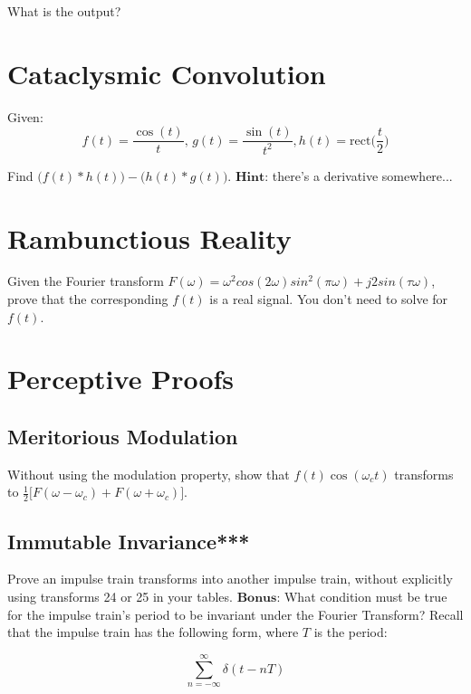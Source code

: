 \documentclass{article}
\begin{document}
What is the output?

\vfill

\newpage

\section{Cataclysmic Convolution}

Given:$$f(t) = \frac{\cos(t)}{t},\, g(t) = \frac{\sin(t)}{t^2}, h(t) = \text{rect}\bigg(\frac{t}{2}\bigg)$$

Find $\big(f(t)*h(t)\big) - \big(h(t)*g(t)\big)$. $\textbf{Hint:}$ there's a derivative somewhere...

\vfill

\section{Rambunctious Reality}

Given the Fourier transform $F(\omega) = \omega^2cos(2\omega)sin^2(\pi\omega) + j2sin(\tau\omega)$, prove that the corresponding $f(t)$ is a real signal. You don't need to solve for $f(t)$.

\vfill

\newpage


\section{Perceptive Proofs}

\subsection{Meritorious Modulation}
Without using the modulation property, show that $f(t)\cos(\omega_c t)$ transforms to $\frac{1}{2}\big[F(\omega - \omega_c) + F(\omega + \omega_c)\big]$.
\vfill

\subsection{Immutable Invariance***}
Prove an impulse train transforms into another impulse train, without explicitly using transforms 24 or 25 in your tables. 
\newline
$\textbf{Bonus:}$ What condition must be true for the impulse train's period to be invariant under the Fourier Transform?
Recall that the impulse train has the following form, where $T$ is the period:

$$\sum_{n = -\infty}^{\infty} \delta(t - nT)$$
\end{document}
